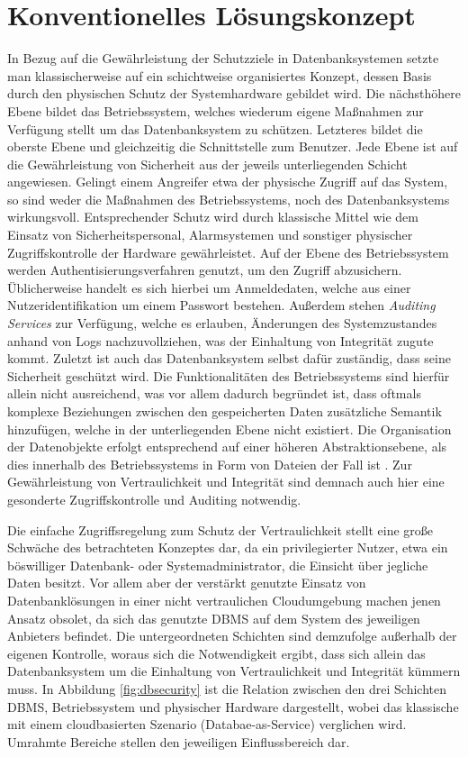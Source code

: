 \section{Konventionelles Lösungskonzept}

In Bezug auf die Gewährleistung der Schutzziele in Datenbanksystemen setzte man klassischerweise auf ein schichtweise organisiertes Konzept, dessen Basis durch den physischen Schutz der Systemhardware gebildet wird. Die nächsthöhere Ebene bildet das Betriebssystem, welches wiederum eigene Maßnahmen zur Verfügung stellt um das Datenbanksystem zu schützen. Letzteres bildet die oberste Ebene und gleichzeitig die Schnittstelle zum Benutzer. Jede Ebene ist auf die Gewährleistung von Sicherheit aus der jeweils unterliegenden Schicht angewiesen. Gelingt einem Angreifer etwa der physische Zugriff auf das System, so sind weder die Maßnahmen des Betriebssystems, noch des Datenbanksystems wirkungsvoll. Entsprechender Schutz wird durch klassische Mittel wie dem Einsatz von Sicherheitspersonal, Alarmsystemen und sonstiger physischer Zugriffskontrolle der Hardware gewährleistet. Auf der Ebene des Betriebssystem werden Authentisierungsverfahren genutzt, um den Zugriff abzusichern. Üblicherweise handelt es sich hierbei um Anmeldedaten, welche aus einer Nutzeridentifikation um einem Passwort bestehen. Außerdem stehen \textit{Auditing Services} zur Verfügung, welche es erlauben, Änderungen des Systemzustandes anhand von Logs nachzuvollziehen, was der Einhaltung von Integrität zugute kommt. Zuletzt ist auch das Datenbanksystem selbst dafür zuständig, dass seine Sicherheit geschützt wird. Die Funktionalitäten des Betriebssystems sind hierfür allein nicht ausreichend, was vor allem dadurch begründet ist, dass oftmals komplexe Beziehungen zwischen den gespeicherten Daten zusätzliche Semantik hinzufügen, welche in der unterliegenden Ebene nicht existiert. Die Organisation der Datenobjekte erfolgt entsprechend auf einer höheren Abstraktionsebene, als dies innerhalb des Betriebssystems in Form von Dateien der Fall ist \cite{Vimercati2001}. Zur Gewährleistung von Vertraulichkeit und Integrität sind demnach auch hier eine gesonderte Zugriffskontrolle und Auditing notwendig.

Die einfache Zugriffsregelung zum Schutz der Vertraulichkeit stellt eine große Schwäche des betrachteten Konzeptes dar, da ein privilegierter Nutzer, etwa ein böswilliger Datenbank- oder Systemadministrator, die Einsicht über jegliche Daten besitzt. Vor allem aber der verstärkt genutzte Einsatz von Datenbanklösungen in einer nicht vertraulichen Cloudumgebung machen jenen Ansatz obsolet, da sich das genutzte DBMS auf dem System des jeweiligen Anbieters befindet. Die untergeordneten Schichten sind demzufolge außerhalb der eigenen Kontrolle, woraus sich die Notwendigkeit ergibt, dass sich allein das Datenbanksystem um die Einhaltung von Vertraulichkeit und Integrität kümmern muss. In Abbildung \ref{fig:dbsecurity} ist die Relation zwischen den drei Schichten DBMS, Betriebssystem und physischer Hardware dargestellt, wobei das klassische mit einem cloudbasierten Szenario (Databae-as-Service) verglichen wird. Umrahmte Bereiche stellen den jeweiligen Einflussbereich dar.

